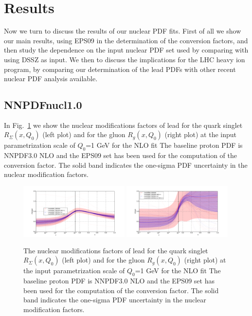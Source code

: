 
\section{Results}

Now we turn to discuss the results of our nuclear PDF fits.
%
First of all we show our main results, using EPS09 in the
determination of the conversion factors, and then
study the dependence on the input nuclear PDF set used
by comparing with using DSSZ as input.
%
We then to discuss the implications for the LHC heavy ion program,
by comparing our determination of the lead PDFs with other
recent nuclear PDF analysis available.



\subsection{NNPDFnucl1.0}

In Fig.~\ref{fig:nuclfact1}
we show the nuclear modifications factors of lead for the
  quark singlet $R_{\Sigma}(x,Q_0)$ (left plot) and for the
  gluon $R_{g}(x,Q_0)$ (right plot) at the input parametrization
  scale of $Q_0$=1 GeV for the NLO fit
  The baseline proton PDF is NNPDF3.0 NLO and the
  EPS09 set
  has been used for the computation of the conversion factor.
  The solid band indicates the one-sigma PDF uncertainty in the
  nuclear modification factors.

\begin{figure}[t]
\begin{center}
 \includegraphics[width=0.49\textwidth]{plots/pdfcompSinglet-final1.pdf}
  \includegraphics[width=0.49\textwidth]{plots/pdfcompGluon-final1.pdf}
 \end{center}
\vspace{-0.3cm}
\caption{\small The nuclear modifications factors of lead for the
  quark singlet $R_{\Sigma}(x,Q_0)$ (left plot) and for the
  gluon $R_{g}(x,Q_0)$ (right plot) at the input parametrization
  scale of $Q_0$=1 GeV for the NLO fit
  The baseline proton PDF is NNPDF3.0 NLO and the
  EPS09 set
  has been used for the computation of the conversion factor.
  The solid band indicates the one-sigma PDF uncertainty in the
  nuclear modification factors.
}
\label{fig:nuclfact1}
\end{figure}





